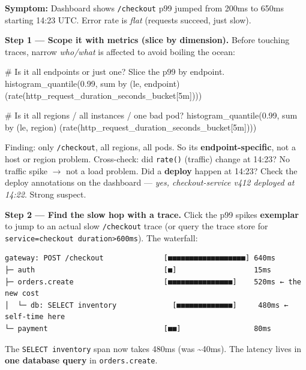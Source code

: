 \documentclass[11pt]{article}
\newenvironment{Shaded}{\begin{snugshade}}{\end{snugshade}}
\newcommand{\NormalTok}[1]{\textcolor[rgb]{0.81,0.81,0.76}{#1}}
\begin{document}
\textbf{Symptom:} Dashboard shows \texttt{/checkout} p99 jumped from 200ms to 650ms starting 14:23 UTC. Error rate is \emph{flat} (requests succeed, just slow).

\textbf{Step 1 --- Scope it with metrics (slice by dimension).} Before touching traces, narrow \emph{who/what} is affected to avoid boiling the ocean:


\begin{Shaded}
\begin{Highlighting}[]
\NormalTok{\# Is it all endpoints or just one? Slice the p99 by endpoint.}
\NormalTok{histogram\_quantile(0.99,}
\NormalTok{  sum by (le, endpoint) (rate(http\_request\_duration\_seconds\_bucket[5m])))}

\NormalTok{\# Is it all regions / all instances / one bad pod?}
\NormalTok{histogram\_quantile(0.99,}
\NormalTok{  sum by (le, region) (rate(http\_request\_duration\_seconds\_bucket[5m])))}
\end{Highlighting}
\end{Shaded}

Finding: only \texttt{/checkout}, all regions, all pods. So it\textquotesingle s \textbf{endpoint-specific}, not a host or region problem. Cross-check: did \texttt{rate()} (traffic) change at 14:23? No traffic spike \(\rightarrow\) not a load problem. Did a \textbf{deploy} happen at 14:23? Check the deploy annotations on the dashboard --- \emph{yes, checkout-service v412 deployed at 14:22}. Strong suspect.

\textbf{Step 2 --- Find the slow hop with a trace.} Click the p99 spike\textquotesingle s \textbf{exemplar} to jump to an actual slow \texttt{/checkout} trace (or query the trace store for \texttt{service=checkout\ duration\textgreater{}600ms}). The waterfall:

\setcodelang{}

\begin{verbatim}
gateway: POST /checkout              [■■■■■■■■■■■■■■■■■■] 640ms
├─ auth                              [■]                  15ms
├─ orders.create                     [■■■■■■■■■■■■■■■]    520ms ← the new cost
│  └─ db: SELECT inventory             [■■■■■■■■■■■■■]     480ms ← self-time here
└─ payment                           [■■]                 80ms
\end{verbatim}

The \texttt{SELECT\ inventory} span now takes 480ms (was \textasciitilde40ms). The latency lives in \textbf{one database query} in \texttt{orders.create}.
\end{document}
